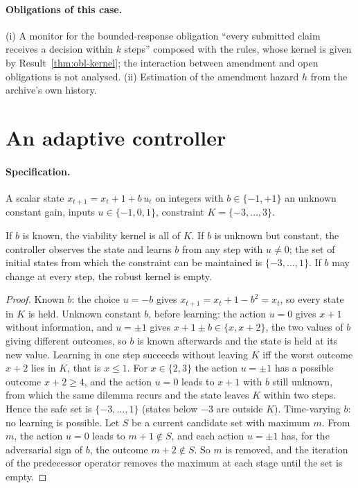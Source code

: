 \paragraph{Obligations of this case.} (i) A monitor for the bounded-response obligation ``every submitted claim receives a decision within $k$ steps'' composed with the rules, whose kernel is given by Result~\ref{thm:obl-kernel}; the interaction between amendment and open obligations is not analysed. (ii) Estimation of the amendment hazard $h$ from the archive's own history.

\section{An adaptive controller}

\paragraph{Specification.} A scalar state $x_{t+1}=x_t+1+b\,u_t$ on integers with $b\in\{-1,+1\}$ an unknown constant gain, inputs $u\in\{-1,0,1\}$, constraint $K=\{-3,\dots,3\}$.

\begin{newresult}\label{prop:adaptive}
If $b$ is known, the viability kernel is all of $K$. If $b$ is unknown but constant, the controller observes the state and learns $b$ from any step with $u\ne0$; the set of initial states from which the constraint can be maintained is $\{-3,\dots,1\}$. If $b$ may change at every step, the robust kernel is empty.
\end{newresult}
\begin{proof}
Known $b$: the choice $u=-b$ gives $x_{t+1}=x_t+1-b^2=x_t$, so every state in $K$ is held. Unknown constant $b$, before learning: the action $u=0$ gives $x+1$ without information, and $u=\pm1$ gives $x+1\pm b\in\{x,x+2\}$, the two values of $b$ giving different outcomes, so $b$ is known afterwards and the state is held at its new value. Learning in one step succeeds without leaving $K$ iff the worst outcome $x+2$ lies in $K$, that is $x\le1$. For $x\in\{2,3\}$ the action $u=\pm1$ has a possible outcome $x+2\ge4$, and the action $u=0$ leads to $x+1$ with $b$ still unknown, from which the same dilemma recurs and the state leaves $K$ within two steps. Hence the safe set is $\{-3,\dots,1\}$ (states below $-3$ are outside $K$). Time-varying $b$: no learning is possible. Let $S$ be a current candidate set with maximum $m$. From $m$, the action $u=0$ leads to $m+1\notin S$, and each action $u=\pm1$ has, for the adversarial sign of $b$, the outcome $m+2\notin S$. So $m$ is removed, and the iteration of the predecessor operator removes the maximum at each stage until the set is empty.
\end{proof}

